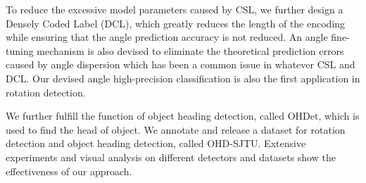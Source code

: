 \documentclass[10pt,journal,compsoc]{IEEEtran}
\begin{document}
\begin{table}[tb!]
\centering
\caption{Results of object heading detection on OHD-SJTU dataset, covering six categories under three different settings of IoU.}
\label{table:OHD-eval}
\end{table}

To reduce the excessive model parameters caused by CSL, we further design a Densely Coded Label (DCL), which greatly reduces the length of the encoding while ensuring that the angle prediction accuracy is not reduced. An angle fine-tuning mechanism is also devised to eliminate the theoretical prediction errors caused by angle dispersion which has been a common issue in whatever CSL and DCL. Our devised angle high-precision classification is also the first application in rotation detection. 

We further fulfill the function of object heading detection, called OHDet, which is used to find the head of object. We annotate and release a dataset for rotation detection and object heading detection, called OHD-SJTU. Extensive experiments and visual analysis on different detectors and datasets show the effectiveness of our approach.
\end{document}
